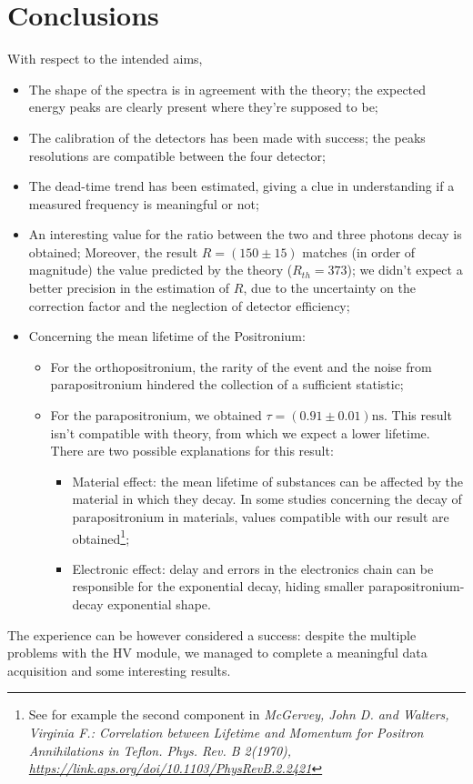 \documentclass[11pt,a4 paper]{article}
\begin{document}
\section{Conclusions}
With respect to the intended aims,
\begin{itemize}[noitemsep]
    \item The shape of the spectra is in agreement with the theory; the expected energy peaks are clearly present where they're supposed to be;
    \item The calibration of the detectors has been made with success; the peaks resolutions are compatible between the four detector;
    \item The dead-time trend has been estimated, giving a clue in understanding if a measured frequency is meaningful or not;
    \item An interesting value for the ratio between the two and three photons decay is obtained; Moreover, the result $R=(150\pm15)$ matches (in order of magnitude) the value predicted by the theory ($R_{th}=373$); we didn't expect a better precision in the estimation of $R$, due to the uncertainty on the correction factor and the neglection of detector efficiency;
    \item Concerning the mean lifetime of the Positronium:
    \begin{itemize}[noitemsep]
        \item For the orthopositronium, the rarity of the event and the noise from parapositronium hindered the collection of a sufficient statistic;
        \item For the parapositronium, we obtained $\tau = ( 0.91 \pm 0.01) \si{\nano\second}$. This result isn't compatible with theory, from which we expect a lower lifetime. There are two possible explanations for this result:
        \begin{itemize}[noitemsep]
            \item Material effect: the mean lifetime of substances can be affected by the material in which they decay. In some studies concerning the decay of parapositronium in materials, values compatible with our result are obtained\footnote{See for example the second component in \emph{McGervey, John D. and Walters, Virginia F.: Correlation between Lifetime and Momentum for Positron Annihilations in Teflon. Phys. Rev. B 2(1970), \url{https://link.aps.org/doi/10.1103/PhysRevB.2.2421}}};
            \item Electronic effect: delay and errors in the electronics chain can be responsible for the exponential decay, hiding smaller parapositronium-decay exponential shape.
        \end{itemize}
    \end{itemize}
\end{itemize}

The experience can be however considered a success: despite the multiple problems with the HV module, we managed to complete a meaningful data acquisition and some interesting results.
\end{document}
